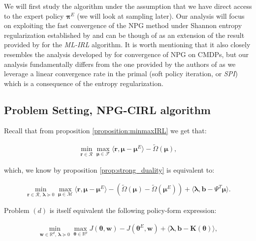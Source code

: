 We will first study the algorithm under the assumption that we have direct access to the expert policy $\bm{\pi}^E$ (we will look at sampling later). 
Our analysis will focus on exploiting the fast convergence of the NPG method under Shannon entropy regularization established by \cite{Cen2021} and can be though of as an extension of the result provided by \cite{Zeng2022} for the \textit{ML-IRL} algorithm. 
It is worth mentioning that it also closely resembles the analysis developed by \cite{Ding2020} for convergence of NPG on CMDPs, but our analysis fundamentally differs from the one provided by the authors of \cite{Ding2020} as we leverage a linear convergence rate in the primal (soft policy iteration, or \textit{SPI}) which is a consequence of the entropy regularization. 

\subsection{Problem Setting, NPG-CIRL algorithm}

Recall that from proposition \ref{proposition:minmaxIRL} we get that: 

\begin{align*}
    \min_{\bm{r}\in\mathcal{R}}\max_{\bm{\mu}\in\mathcal{F}} 
    \langle \bm{r}, \bm{\mu}-\bm{\mu}^E \rangle-\tilde{\Omega}(\bm{\mu}), \tag{p}
\end{align*}

which, we know by proposition \ref{prop:strong_duality} is equivalent to:

\begin{align*}
    \min_{\bm{r}\in\mathcal{R}, ~ \bm{\lambda}\succcurlyeq 0}\max_{\bm{\mu}\in\mathcal{M}} 
    \langle \bm{r}, \bm{\mu}-\bm{\mu}^E \rangle-(\tilde{\Omega}(\bm{\mu})-\tilde{\Omega}(\bm{\mu}^E)) + \langle \bm{\lambda}, \bm{b}-\Psi^T \bm{\mu} \rangle. \tag{d}
\end{align*}

Problem $(d)$ is itself equivalent the following policy-form expression:

\begin{align*}
    \min_{\bm{w}\in\mathbb{R}^d, ~ \bm{\lambda}\succcurlyeq 0}\max_{\bm{\theta}\in\mathbb{R}^p} 
    J(\bm{\theta},\bm{w}) - J(\bm{\theta}^E,\bm{w}) + \langle \bm{\lambda},\bm{b}-\bm{K}(\bm{\theta}) \rangle, \tag{D}
\end{align*}

